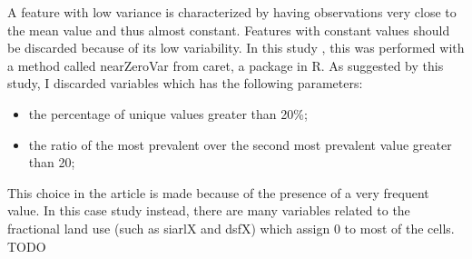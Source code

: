 A feature with low variance is characterized by having observations very close to the mean value and thus almost constant.
Features with constant values should be discarded because of its low variability.
In this study \cite{kuhn2008building}, this was performed with a method called  nearZeroVar from \gls{caret}, a package in R.
As suggested by this study, I discarded variables which has the following parameters: 
\begin{itemize}
    \item the percentage of unique values greater than 20\%;
    \item the ratio of the most prevalent over the second most prevalent value greater than 20;
\end{itemize} 
This choice in the article is made because of the presence of a very frequent value. In this case study instead, there are many variables related to the fractional land use (such as siarlX and dsfX) which assign 0 to most of the cells. TODO

\pagebreak
